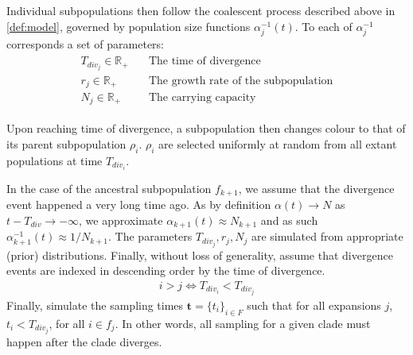 \documentclass{report}
\newcommand{\R}{\mathbb{R}}
\theoremstyle{definition}
\begin{document}
Individual subpopulations then follow the coalescent process described above in \ref{def:model}, governed by population size functions $\alpha^{-1}_{j}(t)$. To each of $\alpha^{-1}_{j}$ corresponds a set of parameters:
\begin{gather}
\begin{aligned}
T_{div_{j}}\in\R_+ \quad&\text{The time of divergence}\\
r_j\in\R_+\quad&\text{The growth rate of the subpopulation}\\
N_j\in\R_+\quad&\text{The carrying capacity}
\end{aligned}
\end{gather}

Upon reaching time of divergence, a subpopulation then changes colour to that of its parent subpopulation $\rho_i$. $\rho_i$ are selected uniformly at random from all extant populations at time $T_{div_{i}}$.

In the case of the ancestral subpopulation $f_{k+1}$, we assume that the divergence event happened a very long time ago. As by definition $\alpha(t) \rightarrow N$ as $t-T_{div}\rightarrow -\infty$, we approximate $\alpha_{k+1}(t) \approx N_{k+1}$ and as such $\alpha^{-1}_{k+1}(t) \approx 1/N_{k+1}$. The parameters $T_{div_{j}}, r_j, N_j$ are simulated from appropriate (prior) distributions.
Finally, without loss of generality, assume that divergence events are indexed in descending order by the time of divergence.
\begin{gather}
i > j \Leftrightarrow T_{div_i} < T_{div_j}  
\end{gather}
Finally, simulate the sampling times $\mathbf{t}=\{t_i\}_{i\in F}$ such that for all expansions $j$, $t_i < T_{div_j}$, for all $i \in f_j$. In other words, all sampling for a given clade must happen after the clade diverges. 
\end{document}
